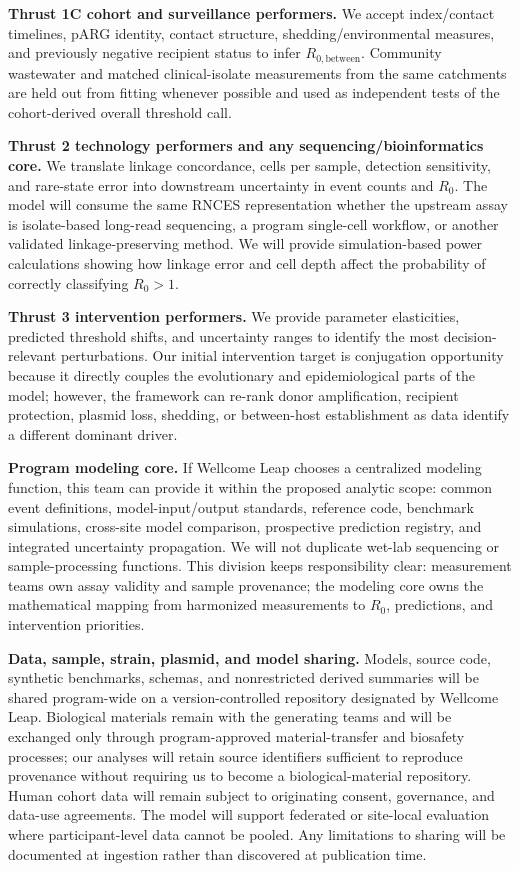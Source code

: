 \documentclass[12pt,a4paper]{article}
\newcommand{\Rbetween}{R_{0,\mathrm{between}}}
\begin{document}
\textbf{Thrust 1C cohort and surveillance performers.} We accept index/contact timelines, pARG identity, contact structure, shedding/environmental measures, and previously negative recipient status to infer $\Rbetween$. Community wastewater and matched clinical-isolate measurements from the same catchments are held out from fitting whenever possible and used as independent tests of the cohort-derived overall threshold call.

\textbf{Thrust 2 technology performers and any sequencing/bioinformatics core.} We translate linkage concordance, cells per sample, detection sensitivity, and rare-state error into downstream uncertainty in event counts and $R_0$. The model will consume the same RNCES representation whether the upstream assay is isolate-based long-read sequencing, a program single-cell workflow, or another validated linkage-preserving method. We will provide simulation-based power calculations showing how linkage error and cell depth affect the probability of correctly classifying $R_0>1$.

\textbf{Thrust 3 intervention performers.} We provide parameter elasticities, predicted threshold shifts, and uncertainty ranges to identify the most decision-relevant perturbations. Our initial intervention target is conjugation opportunity because it directly couples the evolutionary and epidemiological parts of the model; however, the framework can re-rank donor amplification, recipient protection, plasmid loss, shedding, or between-host establishment as data identify a different dominant driver.

\textbf{Program modeling core.} If Wellcome Leap chooses a centralized modeling function, this team can provide it within the proposed analytic scope: common event definitions, model-input/output standards, reference code, benchmark simulations, cross-site model comparison, prospective prediction registry, and integrated uncertainty propagation. We will not duplicate wet-lab sequencing or sample-processing functions. This division keeps responsibility clear: measurement teams own assay validity and sample provenance; the modeling core owns the mathematical mapping from harmonized measurements to $R_0$, predictions, and intervention priorities.

\textbf{Data, sample, strain, plasmid, and model sharing.} Models, source code, synthetic benchmarks, schemas, and nonrestricted derived summaries will be shared program-wide on a version-controlled repository designated by Wellcome Leap. Biological materials remain with the generating teams and will be exchanged only through program-approved material-transfer and biosafety processes; our analyses will retain source identifiers sufficient to reproduce provenance without requiring us to become a biological-material repository. Human cohort data will remain subject to originating consent, governance, and data-use agreements. The model will support federated or site-local evaluation where participant-level data cannot be pooled. Any limitations to sharing will be documented at ingestion rather than discovered at publication time.
\end{document}
